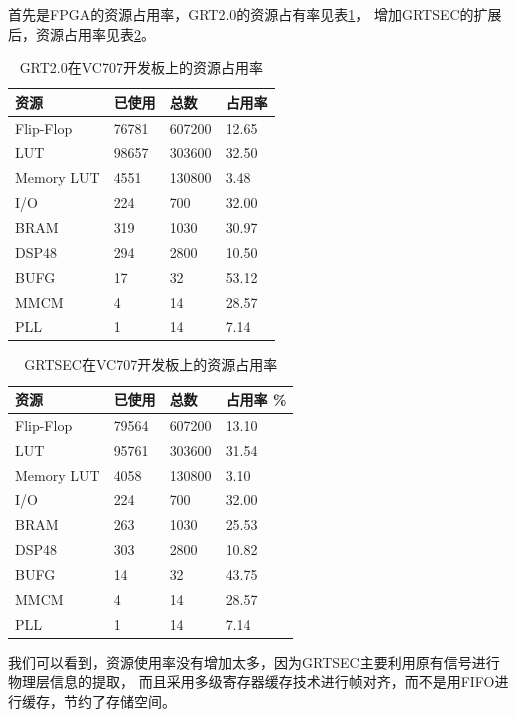   首先是FPGA的资源占用率，GRT2.0的资源占有率见表\ref{tab:envaluate_grt2.0_resource}，
  增加GRTSEC的扩展后，资源占用率见表\ref{tab:envaluate_grtsec_resource}。
    \begin{table}[!hbp]
    \centering
    \caption{GRT2.0在VC707开发板上的资源占用率}
    \label{tab:envaluate_grt2.0_resource}
      \begin{tabular}{|l|l|l|l|} \hline
      资源 & 已使用 & 总数 & 占用率 \\ \hline
      Flip-Flop & 76781 & 607200 & 12.65 \\ \hline
      LUT & 98657 & 303600 & 32.50 \\ \hline
      Memory LUT & 4551 & 130800 & 3.48 \\ \hline
      I/O & 224 & 700 & 32.00 \\ \hline
      BRAM & 319 & 1030 & 30.97 \\ \hline
      DSP48 & 294 & 2800 & 10.50 \\ \hline
      BUFG & 17 & 32 & 53.12 \\ \hline
      MMCM & 4 & 14 & 28.57 \\ \hline
      PLL & 1 & 14 & 7.14 \\ \hline
      \end{tabular}
    \end{table}
    \begin{table}[!hbp]
    \centering
    \caption{GRTSEC在VC707开发板上的资源占用率}
    \label{tab:envaluate_grtsec_resource}
      \begin{tabular}{|l|l|l|l|} \hline
      资源 & 已使用 & 总数 & 占用率 \% \\ \hline
      Flip-Flop & 79564 & 607200 & 13.10 \\ \hline
      LUT & 95761 & 303600 & 31.54 \\ \hline
      Memory LUT & 4058 & 130800 & 3.10 \\ \hline
      I/O & 224 & 700 & 32.00 \\ \hline
      BRAM & 263 & 1030 & 25.53 \\ \hline
      DSP48 & 303 & 2800 & 10.82 \\ \hline
      BUFG & 14 & 32 & 43.75 \\ \hline
      MMCM & 4 & 14 & 28.57 \\ \hline
      PLL & 1 & 14 & 7.14 \\ \hline
      \end{tabular}
    \end{table}

  我们可以看到，资源使用率没有增加太多，因为GRTSEC主要利用原有信号进行物理层信息的提取，
  而且采用多级寄存器缓存技术进行帧对齐，而不是用FIFO进行缓存，节约了存储空间。

